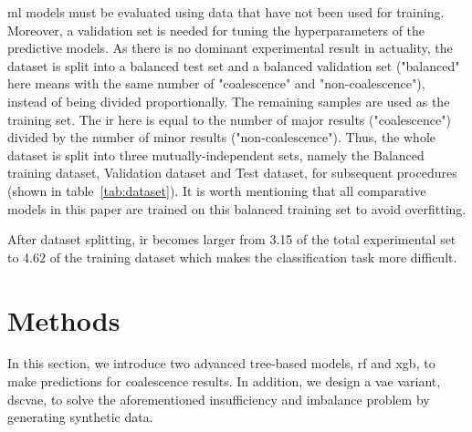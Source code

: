 \documentclass[twoside,twocolumn,9pt]{article}
\begin{document}
\acrshort*{ml} models must be evaluated using data that have not been used for training. Moreover, a validation set is needed for tuning the hyperparameters of the predictive models. As there is no dominant experimental result in actuality, the dataset is split into a balanced test set and a balanced validation set ("balanced" here means with the same number of "coalescence" and "non-coalescence"), instead of being divided proportionally. The remaining samples are used as the training set. The \acrfull*{ir} here is equal to the number of major results ("coalescence") divided by the number of minor results ("non-coalescence"). Thus, the whole dataset is split into three mutually-independent sets, namely the Balanced training dataset, Validation dataset and Test dataset, for subsequent procedures (shown in table~\ref{tab:dataset}). It is worth mentioning that all comparative models in this paper are trained on this balanced training set to avoid overfitting. 
\begin{table}[!htb]
    \centering
        \caption{Dataset Split}
    \label{tab:dataset}
\end{table}

After dataset splitting, \acrshort*{ir}  becomes larger from 3.15 of the total experimental set to 4.62 of the training dataset which makes the classification task more difficult.


\section{Methods} \label{mtd:method}
In this section, we introduce two advanced tree-based models, \acrshort*{rf} and \acrlong*{xgb}, to make predictions for coalescence results. In addition, we design a \acrshort*{vae} variant, \acrshort*{dscvae}, to solve the aforementioned insufficiency and imbalance problem by generating synthetic data. 
\end{document}
